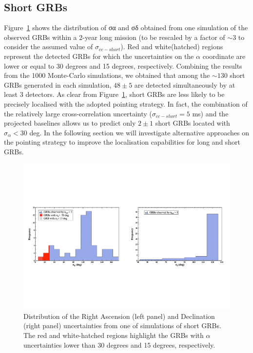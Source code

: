\documentclass[]{spie}  %
\begin{document}
\subsection{Short GRBs}

Figure~\ref{fig:res_short} shows the distribution of σα and σδ obtained from one simulation of the observed GRBs within a 2-year long mission (to be rescaled by a factor of $\sim3$ to consider the assumed value of $\sigma_{cc-short}$). Red and white(hatched) regions represent the detected GRBs for which the uncertainties on the $\alpha$ coordinate are lower or equal to 30 degrees and 15 degrees, respectively. Combining the results from the 1000 Monte-Carlo simulations, we obtained that among the $\sim130$ short GRBs generated in each simulation, $48\pm5$ are detected simultaneously by at least 3 detectors. As clear from Figure~\ref{fig:res_short}, short GRBs are less likely to be precisely localised with the adopted pointing strategy. In fact, the combination of the relatively large cross-correlation uncertainty ($\sigma_{cc-short} = 5$ ms) and the projected baselines allows us to predict only $2\pm1$ short GRBs located with $\sigma_\alpha < 30$ deg. In the following section we will investigate alternative approaches on the pointing strategy to improve the localisation capabilities for long and short GRBs.


\begin{figure}[h!]
\centering
\includegraphics[scale=0.45,angle=0]{res_short_pos}
\vspace{-2.5cm}
\caption{Distribution of the Right Ascension (left panel) and Declination (right panel) uncertainties from one of simulations of short GRBs. The red and white-hatched regions highlight the GRBs with $\alpha$ uncertainties lower than 30 degrees and 15 degrees, respectively.} 
\label{fig:res_short}
\end{figure}
\end{document}
